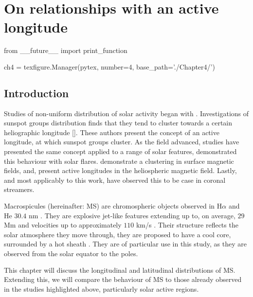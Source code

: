 \chapter{On relationships with an active longitude}\label{ch:4}  %

\begin{pycode}[chapter4]
from __future__ import print_function

ch4 = texfigure.Manager(pytex, number=4, base_path='./Chapter4/')
\end{pycode}

\section{Introduction}
Studies of non-uniform distribution of solar activity began with \cite{Chidambara1932}.
Investigations of sunspot groups distribution finds that they tend to cluster towards a certain heliographic longitude [\cite{Bumba1965,Balthasar1984,Wilkinson1991}].
These authors present the concept of an active longitude, at which sunspot groups cluster.
As the field advanced, studies have presented the same concept applied to a range of solar features, \cite{Zhang2007} demonstrated this behaviour with solar flares.
\cite{Benevolenskaya1999} demonstrate a clustering in surface magnetic fields, and, \cite{Mursula2004} present active longitudes in the heliospheric magnetic field.
Lastly, and most applicably to this work, \cite{Jing2011} have observed this to be case in coronal streamers.

\newpage
Macrospicules (hereinafter: MS) are chromospheric objects observed in H$\alpha$ and He $30.4$ nm \cite{Bohlin1975,Wang199 8,Murawski2011,Scullion2010}. 
They are explosive jet-like features extending up to, on average, $29$ Mm and velocities up to approximately $110$ km/s \cite{Zaqara_Erdelyi2009}. 
Their structure reflects the solar atmosphere they move through, they are proposed to have a cool core, surrounded by a hot sheath \cite{Parenti2002}. 
They are of particular use in this study, as they are observed from the solar equator to the poles. 

This chapter will discuss the longitudinal and latitudinal distributions of MS.
Extending this, we will compare the behaviour of MS to those already observed in the studies highlighted above, particularly solar active regions.

